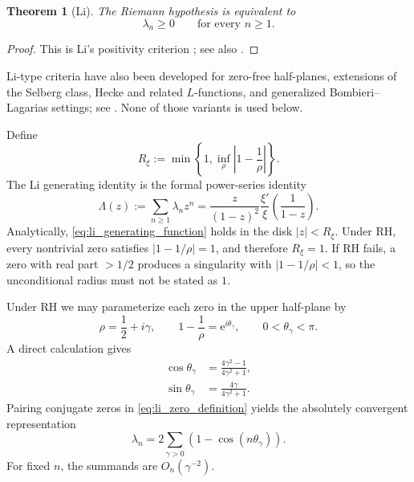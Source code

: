 \documentclass[preprint,12pt]{elsarticle}
\numberwithin{equation}{section}
\theoremstyle{plain}
\newtheorem{theorem}{Theorem}[section]
\theoremstyle{definition}
\theoremstyle{remark}
\newcommand{\RH}{\mathrm{RH}}
\newcommand{\e}{\mathrm e}
\begin{document}
\begin{theorem}[Li]
\label{thm:li_criterion}
The Riemann hypothesis is equivalent to
\begin{equation}
\lambda_n\ge0
\qquad\text{for every }n\ge1.
\label{eq:li_criterion}
\end{equation}
\end{theorem}

\begin{proof}
This is Li's positivity criterion \cite{Li1997}; see also \cite{BombieriLagarias1999,Lagarias2007}.
\end{proof}

Li-type criteria have also been developed for zero-free half-planes, extensions of the Selberg
class, Hecke and related \(L\)-functions, and generalized Bombieri--Lagarias settings; see
\cite{Freitas2006,Droll2012,OmarOuniMazhouda2014,OmarOuni2017,
Sekatskii2014,BucurErnvallOdzakSmajlovic2016,Palojarvi2018}.  None of those variants is used below.

Define
\begin{equation}
R_\xi:=\min\!\left\{1,\inf_{\rho}\left|1-\frac1\rho\right|\right\}.
\label{eq:li_generating_radius}
\end{equation}
The Li generating identity is the formal power-series identity
\begin{equation}
\Lambda(z):=\sum_{n\ge1}\lambda_n z^n
=
\frac{z}{(1-z)^2}
\frac{\xi'}{\xi}\!\left(\frac{1}{1-z}\right).
\label{eq:li_generating_function}
\end{equation}
Analytically, \eqref{eq:li_generating_function} holds in the disk $|z|<R_\xi$. Under $\RH$, every nontrivial zero satisfies $|1-1/\rho|=1$, and therefore $R_\xi=1$. If $\RH$ fails, a zero with real part $>1/2$ produces a singularity with $|1-1/\rho|<1$, so the unconditional radius must not be stated as $1$.

Under $\RH$ we may parameterize each zero in the upper half-plane by
\begin{equation}
\rho=\frac12+i\gamma,
\qquad
1-\frac1\rho=\e^{i\theta_\gamma},
\qquad 0<\theta_\gamma<\pi.
\label{eq:theta_parameterization}
\end{equation}
A direct calculation gives
\begin{align}
\cos\theta_\gamma
&=\frac{4\gamma^2-1}{4\gamma^2+1},
\label{eq:theta_cos}\\
\sin\theta_\gamma
&=\frac{4\gamma}{4\gamma^2+1}.
\label{eq:theta_sin}
\end{align}
Pairing conjugate zeros in \eqref{eq:li_zero_definition} yields the absolutely convergent representation
\begin{equation}
\lambda_n
=2\sum_{\gamma>0}
\left(1-\cos(n\theta_\gamma)\right).
\label{eq:li_cosine_representation}
\end{equation}
For fixed $n$, the summands are $O_n(\gamma^{-2})$.
\end{document}
